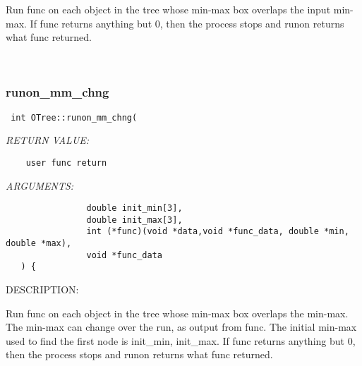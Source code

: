    Run func on each object in the tree whose min-max box overlaps the input min-max.
   If func returns anything but 0, then the process stops and runon returns what func returned. 
 
\mbox{}\hrulefill\ 
 
\subsubsection [runon\_mm\_chng] {runon\_mm\_chng}


  
\begin{verbatim} int OTree::runon_mm_chng(
 \end{verbatim}{\em RETURN VALUE:}
\begin{verbatim}    user func return\end{verbatim}{\em ARGUMENTS:}
\begin{verbatim}                double init_min[3],
                double init_max[3],
                int (*func)(void *data,void *func_data, double *min, double *max),
                void *func_data
   ) {\end{verbatim}
{\sf DESCRIPTION:\\ }


   Run func on each object in the tree whose min-max box overlaps the min-max.
   The min-max can change over the run, as output from func.  The initial min-max
   used to find the first node is init_min, init_max.
   If func returns anything but 0, then the process stops and runon returns what func returned.
\setlength{\parskip}{\oldparskip}
\setlength{\parindent}{\oldparindent}
\setlength{\baselineskip}{\oldbaselineskip}
